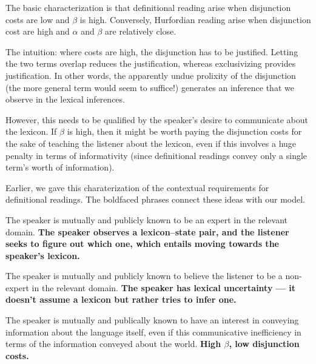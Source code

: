 \documentclass{article}
\begin{document}
\begin{examples}
\item The basic characterization is that definitional reading arise
  when disjunction costs are low and $\beta$ is high. Conversely,
  Hurfordian reading arise when disjunction cost are high and $\alpha$
  and $\beta$ are relatively close.
  
\item The intuition: where costs are high, the disjunction has to be
  justified. Letting the two terms overlap reduces the justification,
  whereas exclusivizing provides justification. In other words, the
  apparently undue prolixity of the disjunction (the more general term
  would seem to suffice!) generates an inference that we observe in
  the lexical inferences.
  
\item However, this needs to be qualified by the speaker's desire to
  communicate about the lexicon. If $\beta$ is high, then it might be
  worth paying the disjunction costs for the sake of teaching the
  listener about the lexicon, even if this involves a huge penalty in
  terms of informativity (since definitional readings convey only
  a single term's worth of information).

\item Earlier, we gave this charaterization of the contextual
  requirements for definitional readings. The boldfaced phrases
  connect these ideas with our model.

  \begin{examples}
  \item The speaker is mutually and publicly known to be an expert in
    the relevant domain. \textbf{The speaker observes a lexicon--state
      pair, and the listener seeks to figure out which one, which
      entails moving towards the speaker's lexicon.}      

  \item The speaker is mutually and publicly known to believe the
    listener to be a non-expert in the relevant domain.  \textbf{The
      speaker has lexical uncertainty --- it doesn't assume a lexicon
      but rather tries to infer one.}

  \item The speaker is mutually and publically known to have an
    interest in conveying information about the language itself, even
    if this communicative inefficiency in terms of the information
    conveyed about the world.  \textbf{High $\beta$, low disjunction
      costs.}
  \end{examples}


\end{examples}
\end{document}
